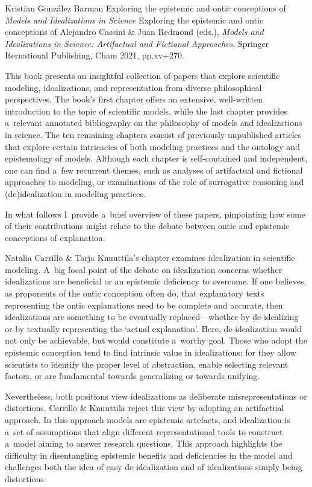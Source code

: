 \begin{recengenv}{Kristian González Barman}
	{Exploring the epistemic and ontic conceptions of \textit{Models and Idealizations in Science}}
	{Exploring the epistemic and ontic conceptions of }
	{Alejandro Cassini \& Juan Redmond (eds.), {\textit{Models and Idealizations in Science: Artifactual and Fictional Approaches}}, Springer Iternational Publishing, Cham 2021, pp.xv+270.}


\noindent This book presents an insightful collection of papers that explore scientific modeling, idealizations, and representation from diverse philosophical perspectives. The book's first chapter offers an extensive, well-written introduction to the topic of scientific models, while the last chapter provides a~relevant annotated bibliography on the philosophy of models and idealizations in science. The ten remaining chapters consist of previously unpublished articles that explore certain intricacies of both modeling practices and the ontology and epistemology of models. Although each chapter is self-contained and independent, one can find a~few recurrent themes, such as analyses of artifactual and fictional approaches to modeling, or examinations of the role of surrogative reasoning and (de)idealization in modeling practices.

In what follows I~provide a~brief overview of these papers, pinpointing how some of their contributions might relate to the debate between ontic and epistemic conceptions of explanation.

Natalia Carrillo \& Tarja Knuuttila's chapter examines idealization in scientific modeling. A~big focal point of the debate on idealization concerns whether idealizations are beneficial or an epistemic deficiency to overcome. If one believes, as proponents of the ontic conception often do, that explanatory texts representing the ontic explanations need to be complete and accurate, then idealizations are something to be eventually replaced---whether by de-idealizing or by textually representing the ‘actual explanation'. Here, de-idealization would not only be achievable, but would constitute a~worthy goal. Those who adopt the epistemic conception tend to find intrinsic value in idealizations; for they allow scientists to identify the proper level of abstraction, enable selecting relevant factors, or are fundamental towards generalizing or towards unifying.

Nevertheless, both positions view idealizations as deliberate misrepresentations or distortions. Carrillo \& Knuuttila reject this view by adopting an artifactual approach. In this approach models are epistemic artefacts, and idealization is a~set of assumptions that align different representational tools to construct a~model aiming to answer research questions. This approach highlights the difficulty in disentangling epistemic benefits and deficiencies in the model and challenges both the idea of easy de-idealization and of idealizations simply being distortions.


\end{recengenv}
